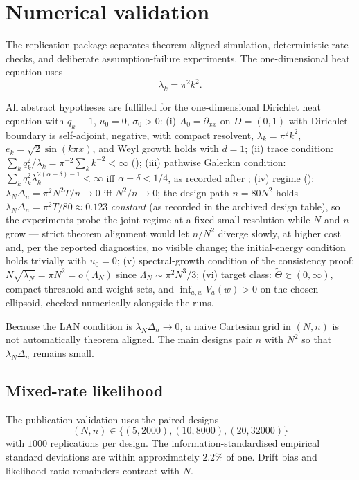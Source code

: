 \section{Numerical validation}\label{sec:numerics}

The replication package separates theorem-aligned simulation, deterministic rate checks, and deliberate assumption-failure experiments. The one-dimensional heat equation uses
\[
 \lambda_k=\pi^2k^2.
\]
\begin{remark}\label{rem:heat-verify}
All abstract hypotheses are fulfilled for the one-dimensional Dirichlet heat equation with $q_k\equiv1$, $u_0=0$, $\sigma_0>0$:
(i) $A_0=\partial_{xx}$ on $D=(0,1)$ with Dirichlet boundary is self-adjoint, negative, with compact resolvent, $\lambda_k=\pi^2k^2$, $e_k=\sqrt2\sin(k\pi x)$, and Weyl growth holds with $d=1$;
(ii) trace condition: $\sum_kq_k^2/\lambda_k=\pi^{-2}\sum_kk^{-2}<\infty$ ();
(iii) pathwise Galerkin condition: $\sum_kq_k^2\lambda_k^{2(\alpha+\delta)-1}<\infty$ iff $\alpha+\delta<1/4$, as recorded after ;
(iv) regime (): $\lambda_N\Delta_n=\pi^2N^2T/n\to0$ iff $N^2/n\to0$; the design path $n=80N^2$ holds $\lambda_N\Delta_n=\pi^2T/80\approx0.123$ \emph{constant} (as recorded in the archived design table), so the experiments probe the joint regime at a fixed small resolution while $N$ and $n$ grow --- strict theorem alignment would let $n/N^2$ diverge slowly, at higher cost and, per the reported diagnostics, no visible change; the initial-energy condition holds trivially with $u_0=0$;
(v) spectral-growth condition of the consistency proof: $N\sqrt{\lambda_N}=\pi N^2=o(\Lambda_N)$ since $\Lambda_N\sim\pi^2N^3/3$;
(vi) target class: $\widetilde\Theta\Subset(0,\infty)$, compact threshold and weight sets, and $\inf_{a,w}V_a(w)>0$ on the chosen ellipsoid, checked numerically alongside the runs.
\end{remark}

Because the LAN condition is $\lambda_N\Delta_n\to0$, a naive Cartesian grid in $(N,n)$ is not automatically theorem aligned. The main designs pair $n$ with $N^2$ so that $\lambda_N\Delta_n$ remains small.

\subsection{Mixed-rate likelihood}

The publication validation uses the paired designs
\[
 (N,n)\in\{(5,2000),(10,8000),(20,32000)\}
\]
with $1000$ replications per design. The information-standardised empirical standard deviations are within approximately $2.2\%$ of one. Drift bias and likelihood-ratio remainders contract with $N$.


